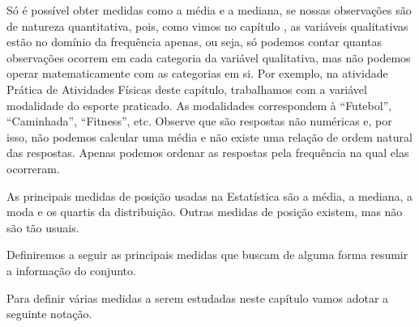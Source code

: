Só é possível obter medidas como a média e a mediana, se nossas observações são de natureza quantitativa, pois, como vimos no capítulo
, as variáveis qualitativas estão no domínio da frequência apenas, ou seja, só podemos contar quantas observações ocorrem em cada categoria da variável qualitativa, mas não podemos operar matematicamente com as categorias em si. Por exemplo, na atividade Prática de Atividades Físicas deste capítulo, trabalhamos com a variável modalidade do esporte praticado. As modalidades correspondem à “Futebol”, “Caminhada”, “Fitness”, etc. Observe que são respostas não numéricas e, por isso, não podemos calcular uma média e não existe uma relação de ordem natural das respostas. Apenas podemos ordenar as respostas pela frequência na qual elas ocorreram.

As principais medidas de posição usadas na Estatística são a média, a mediana, a moda e os quartis da distribuição. Outras medidas de posição existem, mas não são tão usuais.

Definiremos a seguir as principais medidas que buscam de alguma forma resumir a informação do conjunto.

Para definir várias medidas a serem estudadas neste capítulo vamos adotar a seguinte notação.

